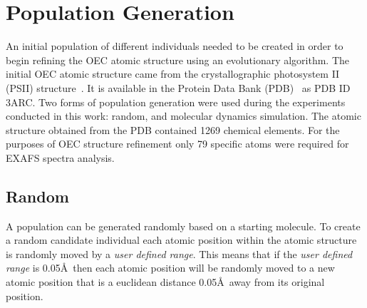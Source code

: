 \section{Population Generation}
\label{sec:pop-generation}

An initial population of different individuals needed to be created in order to begin refining the OEC atomic structure using an evolutionary algorithm. The initial OEC atomic structure came from the crystallographic photosystem II (PSII) structure~\cite{umena2011crystal}. It is available in the Protein Data Bank (PDB)~\cite{databank} as PDB ID 3ARC. Two forms of population generation were used during the experiments conducted in this work: random, and molecular dynamics simulation. The atomic structure obtained from the PDB contained 1269 chemical elements. For the purposes of OEC structure refinement only 79 specific atoms were required for EXAFS spectra analysis.


\subsection{Random}
\label{subsec:random-population}

A population can be generated randomly based on a starting molecule. To create a random candidate individual each atomic position within the atomic structure is randomly moved by a \textit{user defined range}. This means that if the \textit{user defined range} is 0.05\AA\ then each atomic position will be randomly moved to a new atomic position that is a euclidean distance 0.05\AA\ away from its original position.

